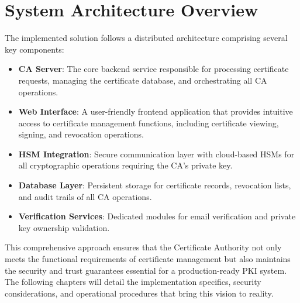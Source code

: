 \section{System Architecture Overview}

The implemented solution follows a distributed architecture comprising several key components:

\begin{itemize}
    \item \textbf{CA Server}: The core backend service responsible for processing certificate requests, managing the certificate database, and orchestrating all CA operations.
    
    \item \textbf{Web Interface}: A user-friendly frontend application that provides intuitive access to certificate management functions, including certificate viewing, signing, and revocation operations.
    
    \item \textbf{HSM Integration}: Secure communication layer with cloud-based HSMs for all cryptographic operations requiring the CA's private key.
    
    \item \textbf{Database Layer}: Persistent storage for certificate records, revocation lists, and audit trails of all CA operations.
    
    \item \textbf{Verification Services}: Dedicated modules for email verification and private key ownership validation.
\end{itemize}

This comprehensive approach ensures that the Certificate Authority not only meets the functional requirements of certificate management but also maintains the security and trust guarantees essential for a production-ready PKI system. The following chapters will detail the implementation specifics, security considerations, and operational procedures that bring this vision to reality.\cite{coulouris}